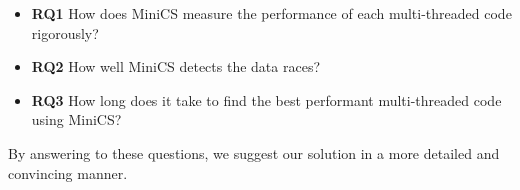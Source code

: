 \vspace{0.2cm}

\begin{itemize}
	\setlength\itemsep{0.5em}
	\item[] \textbf{RQ1} How does MiniCS measure the performance of each multi-threaded code rigorously?
	\item[] \textbf{RQ2} How well MiniCS detects the data races?
	\item[] \textbf{RQ3} How long does it take to find the best performant multi-threaded code using MiniCS?
\end{itemize}

By answering to these questions, we suggest our solution in a more detailed and convincing manner.
